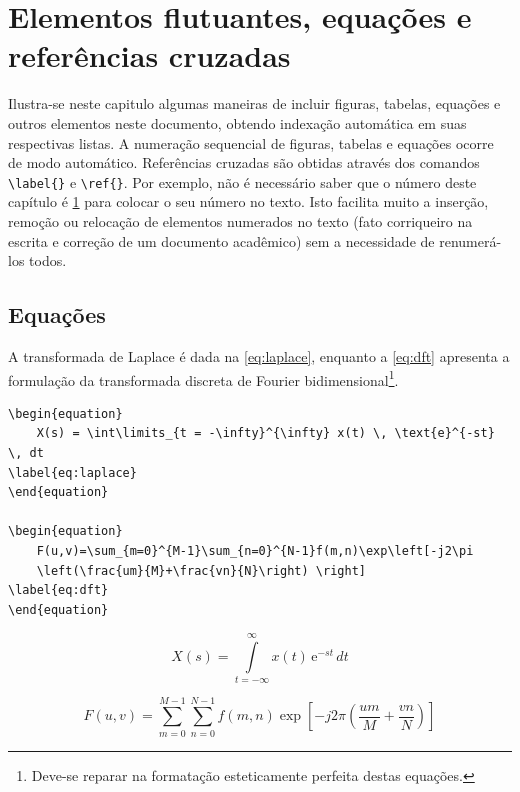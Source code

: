 %
%

\chapter{Elementos flutuantes, equações e referências cruzadas}
\label{chap:ef}

Ilustra-se neste capitulo algumas maneiras de incluir figuras, tabelas, equações e outros elementos neste documento, obtendo indexação automática em suas respectivas listas.
A numeração sequencial de figuras, tabelas e equações ocorre de modo automático.
Referências cruzadas são obtidas através dos comandos \verb#\label{}# e \verb#\ref{}#.
Por exemplo, não é necessário saber que o número deste capítulo é \ref{chap:ef} para colocar o seu número no texto.
Isto facilita muito a inserção, remoção ou relocação de elementos numerados no texto (fato corriqueiro na escrita e correção de um documento acadêmico) sem a necessidade de renumerá-los todos.





 
\section{Equações}
\label{sec:equacoes}

A transformada de Laplace é dada na \autoref{eq:laplace}, enquanto a \autoref{eq:dft} apresenta a formulação da transformada discreta de Fourier bidimensional\footnote{Deve-se reparar na formatação esteticamente perfeita destas equações.}.

\begin{verbatim}
\begin{equation}
    X(s) = \int\limits_{t = -\infty}^{\infty} x(t) \, \text{e}^{-st} \, dt
\label{eq:laplace}
\end{equation}

\begin{equation}
    F(u,v)=\sum_{m=0}^{M-1}\sum_{n=0}^{N-1}f(m,n)\exp\left[-j2\pi
    \left(\frac{um}{M}+\frac{vn}{N}\right) \right]
\label{eq:dft}
\end{equation}
\end{verbatim}


\begin{equation}
    X(s) = \int\limits_{t = -\infty}^{\infty} x(t) \, \text{e}^{-st} \, dt
    \label{eq:laplace}
\end{equation}

\begin{equation}
    F(u, v) = \sum_{m = 0}^{M - 1} \sum_{n = 0}^{N - 1} f(m, n) \exp \left[ -j 2 \pi \left( \frac{u m}{M} + \frac{v n}{N} \right) \right]
    \label{eq:dft}
\end{equation}



